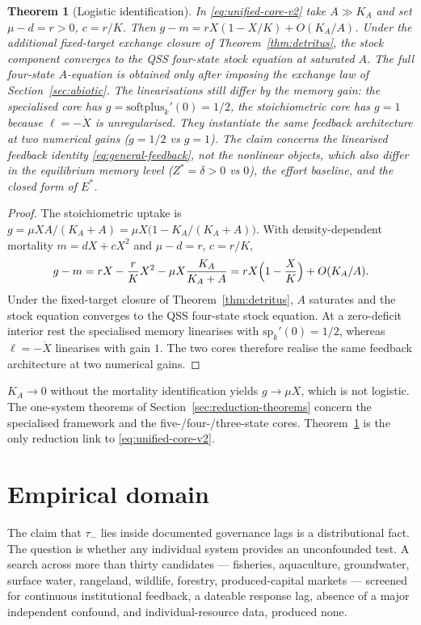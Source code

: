 \documentclass[11pt]{article}
\newtheorem{theorem}{Theorem}
\theoremstyle{definition}
\begin{document}
\begin{theorem}[Logistic identification]
\label{thm:logistic-id}
In \eqref{eq:unified-core-v2} take $A\gg K_A$ and set $\mu-d=r>0$, $c=r/K$. Then $g-m=rX(1-X/K)+O(K_A/A)$. Under the additional fixed-target exchange closure of Theorem~\ref{thm:detritus}, the stock component converges to the QSS four-state stock equation at saturated $A$. The full four-state $A$-equation is obtained only after imposing the exchange law of Section~\ref{sec:abiotic}. The linearisations still differ by the memory gain: the specialised core has $g=\mathrm{softplus}_k'(0)=1/2$, the stoichiometric core has $g=1$ because $\ell=-\dot X$ is unregularised. They instantiate the same feedback architecture at two numerical gains ($g=1/2$ vs $g=1$). The claim concerns the linearised feedback identity \eqref{eq:general-feedback}, not the nonlinear objects, which also differ in the equilibrium memory level ($Z^*=\delta>0$ vs $0$), the effort baseline, and the closed form of $E^*$.
\end{theorem}

\begin{proof}
The stoichiometric uptake is $g=\mu X A/(K_A+A)=\mu X\bigl(1-K_A/(K_A+A)\bigr)$. With density-dependent mortality $m=dX+cX^2$ and $\mu-d=r$, $c=r/K$,
\[
g-m=rX-\frac{r}{K}X^2-\mu X\frac{K_A}{K_A+A}=rX\Bigl(1-\frac{X}{K}\Bigr)+O(K_A/A).
\]
Under the fixed-target closure of Theorem~\ref{thm:detritus}, $A$ saturates and the stock equation converges to the QSS four-state stock equation. At a zero-deficit interior rest the specialised memory linearises with $\mathrm{sp}_k'(0)=1/2$, whereas $\ell=-\dot X$ linearises with gain $1$. The two cores therefore realise the same feedback architecture at two numerical gains.
\end{proof}

$K_A\to 0$ without the mortality identification yields $g\to\mu X$, which is not logistic. The one-system theorems of Section~\ref{sec:reduction-theorems} concern the specialised framework and the five-/four-/three-state cores. Theorem~\ref{thm:logistic-id} is the only reduction link to \eqref{eq:unified-core-v2}.

\section{Empirical domain}
\label{sec:empirical}

The claim that $\tau_-$ lies inside documented governance lags \cite{hocherman2025} is a distributional fact. The question is whether any individual system provides an unconfounded test. A search across more than thirty candidates --- fisheries, aquaculture, groundwater, surface water, rangeland, wildlife, forestry, produced-capital markets --- screened for continuous institutional feedback, a dateable response lag, absence of a major independent confound, and individual-resource data, produced none.
\end{document}
